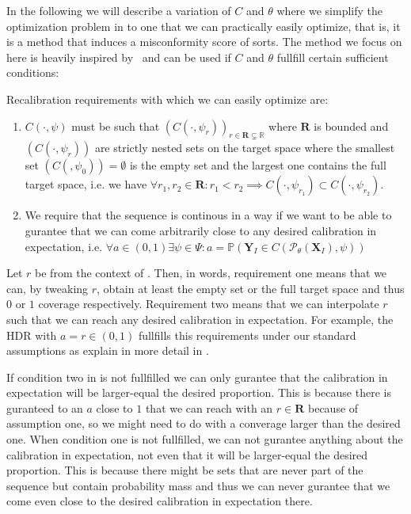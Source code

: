 In the following we will describe a variation of $C$ and $\theta$ where we simplify the optimization problem in  to one that we can practically easily optimize, that is, it is a method that induces a misconformity score of sorts. The method we focus on here is heavily inspired by~\cite{sesia2021conformal} and can be used if $C$ and $\theta$ fullfill certain sufficient conditions:

\begin{definition}\label{def:recalibration_requirements}

    Recalibration requirements with which we can easily optimize  are:
    \begin{enumerate}
        \item $C(\cdot,\psi)$ must be such that $\left(C\left(\cdot, \psi_r\right)\right)_{r \in \mathbf{R} \subsetneq \mathbb{R}}$ where $\mathbf{R}$ is bounded and $(C(\cdot,\psi_r))$ are strictly nested sets on the target space where the smallest set $(C(,\psi_0)) = \emptyset$ is the empty set and the largest one contains the full target space, i.e. we have $\forall r_1, r_2 \in \mathbf{R}: r_1 < r_2 \implies C(\cdot,\psi_{r_1}) \subset C(\cdot, \psi_{r_2})$.
        \item We require that the sequence is continous in a way if we want to be able to gurantee that we can come arbitrarily close to any desired calibration in expectation, i.e. $\forall a\in(0,1) \exists \psi\in\Psi : a = \mathbb{P}(\mathbf{Y}_I \in C(\mathscr{P}_{\theta}(\mathbf{X}_I), \psi))$
    \end{enumerate}
\end{definition}

Let $r$ be from the context of . Then, in words, requirement one means that we can, by tweaking $r$, obtain at least the empty set or the full target space and thus $0$ or $1$ coverage respectively. Requirement two means that we can interpolate $r$ such that we can reach any desired calibration in expectation. For example, the HDR with $a = r \in (0,1)$ fullfills this requirements under our standard assumptions  as explain in more detail in .

If condition two in  is not fullfilled we can only gurantee that the calibration in expectation will be larger-equal the desired proportion. This is because there is guranteed to an $a$ close to $1$ that we can reach with an $r \in \mathbf{R}$ because of assumption one, so we might need to do with a converage larger than the desired one. When condition one is not fullfilled, we can not gurantee anything about the calibration in expectation, not even that it will be larger-equal the desired proportion. This is because there might be sets that are never part of the sequence but contain probability mass and thus we can never gurantee that we come even close to the desired calibration in expectation there.

